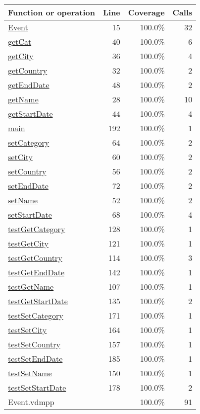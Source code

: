 \begin{longtable}{|l|r|r|r|}
\hline
Function or operation & Line & Coverage & Calls \\
\hline
\hline
\hyperref[Event:15]{Event} & 15&100.0\% & 32 \\
\hline
\hyperref[getCat:40]{getCat} & 40&100.0\% & 6 \\
\hline
\hyperref[getCity:36]{getCity} & 36&100.0\% & 4 \\
\hline
\hyperref[getCountry:32]{getCountry} & 32&100.0\% & 2 \\
\hline
\hyperref[getEndDate:48]{getEndDate} & 48&100.0\% & 2 \\
\hline
\hyperref[getName:28]{getName} & 28&100.0\% & 10 \\
\hline
\hyperref[getStartDate:44]{getStartDate} & 44&100.0\% & 4 \\
\hline
\hyperref[main:192]{main} & 192&100.0\% & 1 \\
\hline
\hyperref[setCategory:64]{setCategory} & 64&100.0\% & 2 \\
\hline
\hyperref[setCity:60]{setCity} & 60&100.0\% & 2 \\
\hline
\hyperref[setCountry:56]{setCountry} & 56&100.0\% & 2 \\
\hline
\hyperref[setEndDate:72]{setEndDate} & 72&100.0\% & 2 \\
\hline
\hyperref[setName:52]{setName} & 52&100.0\% & 2 \\
\hline
\hyperref[setStartDate:68]{setStartDate} & 68&100.0\% & 4 \\
\hline
\hyperref[testGetCategory:128]{testGetCategory} & 128&100.0\% & 1 \\
\hline
\hyperref[testGetCity:121]{testGetCity} & 121&100.0\% & 1 \\
\hline
\hyperref[testGetCountry:114]{testGetCountry} & 114&100.0\% & 3 \\
\hline
\hyperref[testGetEndDate:142]{testGetEndDate} & 142&100.0\% & 1 \\
\hline
\hyperref[testGetName:107]{testGetName} & 107&100.0\% & 1 \\
\hline
\hyperref[testGetStartDate:135]{testGetStartDate} & 135&100.0\% & 2 \\
\hline
\hyperref[testSetCategory:171]{testSetCategory} & 171&100.0\% & 1 \\
\hline
\hyperref[testSetCity:164]{testSetCity} & 164&100.0\% & 1 \\
\hline
\hyperref[testSetCountry:157]{testSetCountry} & 157&100.0\% & 1 \\
\hline
\hyperref[testSetEndDate:185]{testSetEndDate} & 185&100.0\% & 1 \\
\hline
\hyperref[testSetName:150]{testSetName} & 150&100.0\% & 1 \\
\hline
\hyperref[testSetStartDate:178]{testSetStartDate} & 178&100.0\% & 2 \\
\hline
\hline
Event.vdmpp & & 100.0\% & 91 \\
\hline
\end{longtable}


